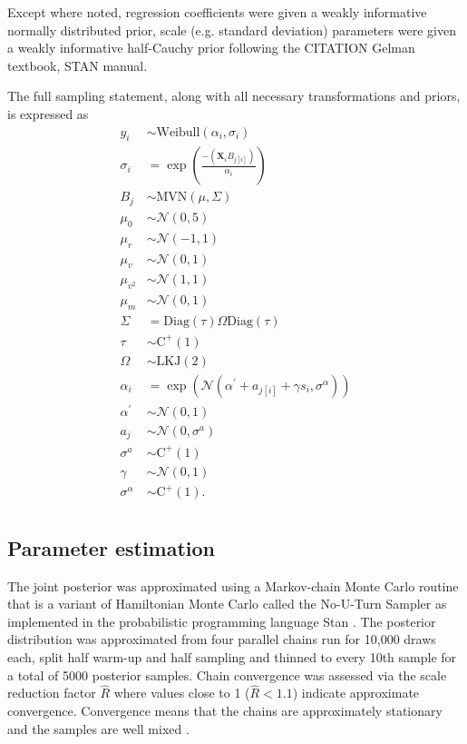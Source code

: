 \documentclass[12pt,letterpaper]{article}
\begin{document}
Except where noted, regression coefficients were given a weakly informative normally distributed prior, scale (e.g. standard deviation) parameters were given a weakly informative half-Cauchy prior following the CITATION Gelman textbook, STAN manual. 

The full sampling statement, along with all necessary transformations and priors, is expressed as
\begin{equation}
  \begin{aligned}
    y_{i} &\sim \mathrm{Weibull}(\alpha_{i}, \sigma_{i}) \\
    \sigma_{i} &= \exp\left(\frac{-(\mathbf{X}_{i} B_{j[i]})}{\alpha_{i}}\right) \\
    B_{j} &\sim \mathrm{MVN}(\mu, \Sigma) \\
    \mu_{0} &\sim \mathcal{N}(0, 5) \\
    \mu_{r} &\sim \mathcal{N}(-1, 1) \\
    \mu_{v} &\sim \mathcal{N}(0, 1) \\
    \mu_{v^{2}} &\sim \mathcal{N}(1, 1) \\
    \mu_{m} &\sim \mathcal{N}(0, 1) \\
    \Sigma &= \text{Diag}(\tau) \Omega \text{Diag}(\tau) \\
    \tau &\sim \mathrm{C^{+}}(1) \\
    \Omega &\sim \text{LKJ}(2) \\
    \alpha_{i} &= \exp\left(\mathcal{N}(\alpha^{\prime} + a_{j[i]} + \gamma s_{i}, \sigma^{\alpha})\right) \\
    \alpha^{\prime} &\sim \mathcal{N}(0, 1) \\
    a_{j} &\sim \mathcal{N}(0, \sigma^{a}) \\
    \sigma^{a} &\sim \mathrm{C^{+}}(1) \\
    \gamma &\sim \mathcal{N}(0, 1) \\
    \sigma^{\alpha} &\sim \mathrm{C^{+}}(1). \\
  \end{aligned}
  \label{eq:wei_total}
\end{equation}


\subsection{Parameter estimation}
The  joint posterior was approximated using a Markov-chain Monte Carlo routine that is a variant of Hamiltonian Monte Carlo called the No-U-Turn Sampler \citep{Hoffman2014} as implemented in the probabilistic programming language Stan \citep{2014stan}. The posterior distribution was approximated from four parallel chains run for 10,000 draws each, split half warm-up and half sampling and thinned to every 10th sample for a total of 5000 posterior samples. Chain convergence was assessed via the scale reduction factor \(\hat{R}\) where values close to 1 (\(\hat{R} < 1.1\)) indicate approximate convergence. Convergence means that the chains are approximately stationary and the samples are well mixed \citep{Gelman2013d}.
\end{document}
